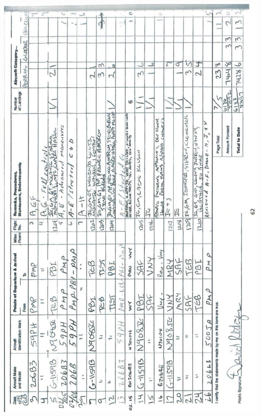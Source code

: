 \documentclass[10pt]{article}
\begin{document}
\includegraphics[max width=\textwidth, center]{2025_02_27_dd68c3d38de88f0516d9g-066}\\
\end{document}

